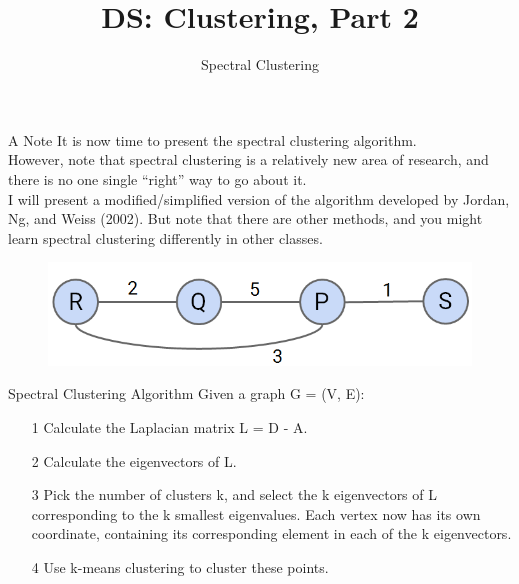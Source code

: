 \documentclass[aspectratio=169]{../latex_main/tntbeamer}  %
\title[Introduction]{DS: Clustering, Part 2}
\subtitle{Spectral Clustering}
\begin{document}
	
	\maketitle
	\begin{frame}{A Note}
	    It is now time to present the spectral clustering algorithm.\\
	    \bigskip
	    However, note that spectral clustering is a relatively new area of research, and there is no one single “right” way to go about it.\\
	    \bigskip
	    I will present a modified/simplified version of the algorithm developed by Jordan, Ng, and Weiss (2002). But note that there are other methods, and you might learn spectral clustering differently in other classes.
	    \begin{figure}
	        \centering
	        \includegraphics[scale=.5]{Bild15}
	    \end{figure}
	\end{frame}
	
	
	\begin{frame}{Spectral Clustering Algorithm}
	    Given a graph G = (V, E):\\
	    \begin{itemize}
	        \item[1]  Calculate the Laplacian matrix L = D - A.
	        \item[2] Calculate the eigenvectors of L.
	        \item[3] Pick the number of clusters k, and select the k eigenvectors of L corresponding to the k smallest eigenvalues. Each vertex now has its own coordinate, containing its corresponding element in each of the k eigenvectors.
	        \item[4] Use k-means clustering to cluster these points.
	    \end{itemize}
	\end{frame}
	
	
	
\end{document}
